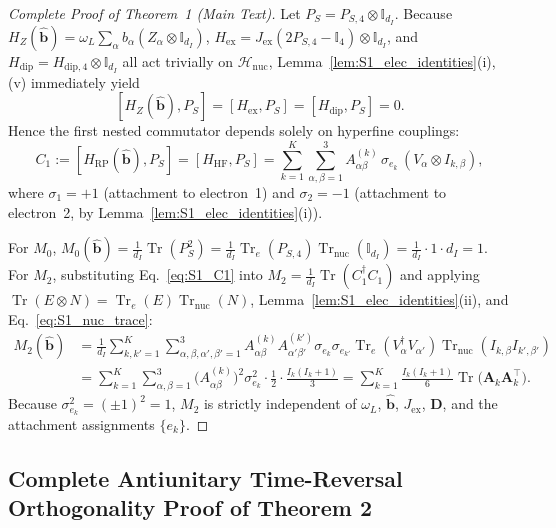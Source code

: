 \documentclass[onecolumn,10pt,notitlepage,amsmath,amssymb,floatfix]{revtex4-2}
\theoremstyle{plain}
\theoremstyle{definition}
\newcommand{\Tr}{\operatorname{Tr}}
\newcommand{\PS}{P_S}
\newcommand{\HRP}{H_{\mathrm{RP}}}
\newcommand{\HZ}{H_Z}
\newcommand{\HHF}{H_{\mathrm{HF}}}
\newcommand{\Hex}{H_{\mathrm{ex}}}
\newcommand{\Hdip}{H_{\mathrm{dip}}}
\begin{document}
\begin{proof}[Complete Proof of Theorem~1 (Main Text)]
Let $\PS = P_{S,4} \otimes \mathbb{I}_{d_I}$. Because $\HZ(\hat{\mathbf{b}}) = \omega_L \sum_\alpha b_\alpha (Z_\alpha \otimes \mathbb{I}_{d_I})$, $\Hex = J_{\mathrm{ex}}(2P_{S,4} - \mathbb{I}_4)\otimes \mathbb{I}_{d_I}$, and $\Hdip = H_{\mathrm{dip},4} \otimes \mathbb{I}_{d_I}$ all act trivially on $\mathcal{H}_{\mathrm{nuc}}$, Lemma~\ref{lem:S1_elec_identities}(i),(v) immediately yield
\[
[\HZ(\hat{\mathbf{b}}), \PS] = [\Hex, \PS] = [\Hdip, \PS] = 0.
\]
Hence the first nested commutator depends solely on hyperfine couplings:
\begin{equation}
\label{eq:S1_C1}
C_1 := [\HRP(\hat{\mathbf{b}}), \PS] = [\HHF, \PS]
= \sum_{k=1}^K \sum_{\alpha,\beta=1}^3 A^{(k)}_{\alpha\beta}\,\sigma_{e_k}\,(V_\alpha \otimes I_{k,\beta}),
\end{equation}
where $\sigma_1 = +1$ (attachment to electron~1) and $\sigma_2 = -1$ (attachment to electron~2, by Lemma~\ref{lem:S1_elec_identities}(i)).

For $M_0$, $M_0(\hat{\mathbf{b}}) = \frac{1}{d_I}\Tr(\PS^2) = \frac{1}{d_I}\Tr_e(P_{S,4})\Tr_{\mathrm{nuc}}(\mathbb{I}_{d_I}) = \frac{1}{d_I}\cdot 1 \cdot d_I = 1$.
For $M_2$, substituting Eq.~\eqref{eq:S1_C1} into $M_2 = \frac{1}{d_I}\Tr(C_1^\dagger C_1)$ and applying $\Tr(E\otimes N) = \Tr_e(E)\Tr_{\mathrm{nuc}}(N)$, Lemma~\ref{lem:S1_elec_identities}(ii), and Eq.~\eqref{eq:S1_nuc_trace}:
\begin{align}
M_2(\hat{\mathbf{b}})
&= \frac{1}{d_I}\sum_{k,k'=1}^K \sum_{\alpha,\beta,\alpha',\beta'=1}^3
A^{(k)}_{\alpha\beta} A^{(k')}_{\alpha'\beta'} \sigma_{e_k}\sigma_{e_{k'}}
\Tr_e(V_\alpha^\dagger V_{\alpha'}) \Tr_{\mathrm{nuc}}(I_{k,\beta} I_{k',\beta'}) \nonumber \\
&= \sum_{k=1}^K \sum_{\alpha,\beta=1}^3 \big(A^{(k)}_{\alpha\beta}\big)^2 \sigma_{e_k}^2 \cdot \frac{1}{2} \cdot \frac{I_k(I_k+1)}{3}
= \sum_{k=1}^K \frac{I_k(I_k+1)}{6}\Tr\big(\mathbf{A}_k \mathbf{A}_k^\top\big).
\label{eq:S1_M2_proof}
\end{align}
Because $\sigma_{e_k}^2 = (\pm 1)^2 = 1$, $M_2$ is strictly independent of $\omega_L$, $\hat{\mathbf{b}}$, $J_{\mathrm{ex}}$, $\mathbf{D}$, and the attachment assignments $\{e_k\}$.
\end{proof}

\subsection{Complete Antiunitary Time-Reversal Orthogonality Proof of Theorem 2}
\label{subsec:S1_thm2}
\end{document}

